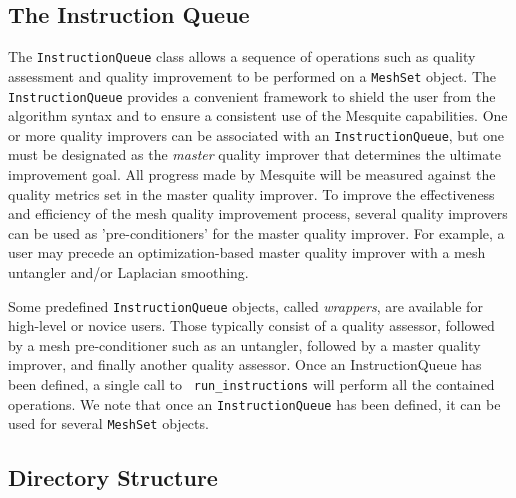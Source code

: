 \documentclass[psfig]{article}
\begin{document}
\subsection{The Instruction Queue} \label{sec:IQ}

The \texttt{InstructionQueue} class allows a sequence of operations
such as quality assessment and quality improvement to be performed on
a \texttt{MeshSet} object. The {\tt
InstructionQueue} provides a convenient framework to shield the user
from the algorithm syntax and to ensure a consistent use of the
Mesquite capabilities.  One or more quality improvers can be
associated with an {\tt InstructionQueue}, but one must be designated
as the {\it master} quality improver that determines the ultimate 
improvement goal.  All progress made by Mesquite will be
measured against the quality metrics set in the master quality
improver.  To improve the effectiveness and efficiency of the mesh
quality improvement process, several quality improvers can be used as
'pre-conditioners' for the master quality improver.  For example, a
user may precede an optimization-based master quality improver with a
mesh untangler and/or Laplacian smoothing.

Some predefined {\tt InstructionQueue} objects, called \emph
{wrappers}, are available for high-level or novice users. Those
typically consist of a quality assessor, followed by a mesh
pre-conditioner such as an untangler, followed by a master quality
improver, and finally another quality assessor.  Once an
InstructionQueue has been defined, a single call to {\tt
run\_instructions} will perform all the contained operations.  We note
that once an {\tt InstructionQueue} has been defined, it can be used
for several \texttt{MeshSet} objects.

\subsection{Directory Structure}
\end{document}
